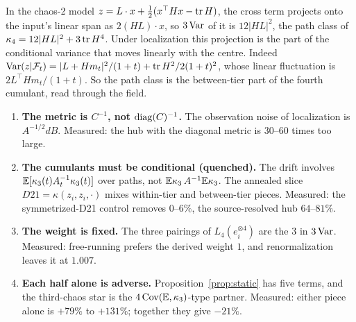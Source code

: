 In the chaos-2 model $z=L\cdot x+\frac12(x^\top Hx-\operatorname{tr} H)$, the cross term projects onto the input's linear span as $2(HL)\cdot x$, so
$3\operatorname{Var}$ of it is $12|HL|^2$, the path class of $\kappa_4=12|HL|^2+3\operatorname{tr} H^4$. Under localization this projection is the part of the
conditional variance that moves linearly with the centre. Indeed $\operatorname{Var}(z|\mathcal F_t)=|L+Hm_t|^2/(1+t)+\operatorname{tr} H^2/2(1+t)^2$, whose
linear fluctuation is $2L^\top Hm_t/(1+t)$. So the path class is the between-tier part of the fourth cumulant, read through the field.

\begin{corollary}
\begin{enumerate}[leftmargin=*]
\item \textbf{The metric is $C^{-1}$, not $\operatorname{diag}(C)^{-1}$.} The observation noise of localization is $A^{-1/2}dB$.
Measured: the hub with the diagonal metric is $30$--$60$ times too large.
\item \textbf{The cumulants must be conditional (quenched).} The drift involves $\mathbb E[\kappa_3(t)A_t^{-1}\kappa_3(t)]$ over paths, not
$\mathbb E\kappa_3\,A^{-1}\mathbb E\kappa_3$. The annealed slice $D21=\kappa(z_i,z_i,\cdot)$ mixes within-tier and between-tier pieces. Measured: the
symmetrized-D21 control removes $0$--$6\%$, the source-resolved hub $64$--$81\%$.
\item \textbf{The weight is fixed.} The three pairings of $L_4(e_i^{\otimes4})$ are the $3$ in $3\operatorname{Var}$. Measured: free-running prefers the
derived weight $1$, and renormalization leaves it at $1.007$.
\item \textbf{Each half alone is adverse.} Proposition~\ref{prop:static} has five terms, and the third-chaos star is the
$4\operatorname{Cov}(\mathbb E,\kappa_3)$-type partner. Measured: either piece alone is $+79\%$ to $+131\%$; together they give $-21\%$.
\end{enumerate}
\end{corollary}

